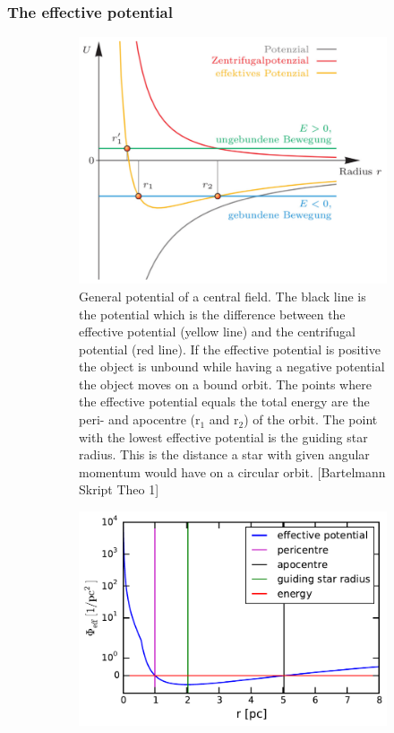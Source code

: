 \subsubsection{The effective potential}
\begin{figure}[htbp]
\centering
	\begin{subfigure}{0.475\textwidth}
	\includegraphics[width=\textwidth]{Plots/eff_potential_bartelmann.png}
	\caption{General potential of a central field. The black line is the potential which is the difference between the effective potential (yellow line) and the centrifugal potential (red line). If the effective potential is positive the object is unbound while having a negative potential the object moves on a bound orbit. The points where the effective potential equals the total energy are the peri- and apocentre (r\(_1\) and r\(_2\)) of the orbit. The point with the lowest effective potential is the guiding star radius. This is the distance a star with given angular momentum would have on a circular orbit. [Bartelmann Skript Theo 1]}
	\label{fig:eff_potential_bartelmann}
	\end{subfigure}
	\hfill
	\begin{subfigure}{0.475\textwidth}
	\includegraphics[width=\textwidth]{Plots/pot_eff_theory_part.pdf}

\end{subfigure}
\end{figure}
